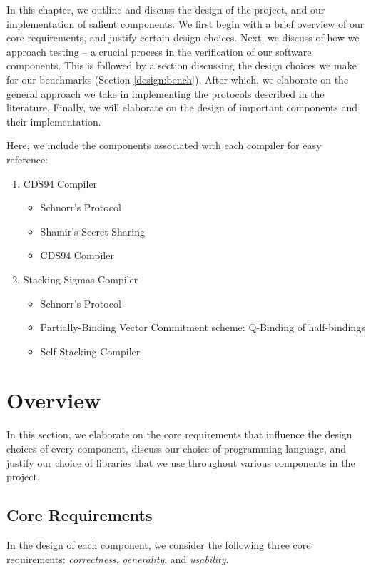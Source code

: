 In this chapter, we outline and discuss the design of the project, and our 
implementation of salient components. 
We first begin with a brief overview of our core requirements, and justify certain design choices.  
Next, we discuss of how we approach testing -- a crucial process in the 
verification of our software components. This is followed by a section discussing the design 
choices we make for our benchmarks (Section \ref{design:bench}). After which, 
we elaborate on the general approach we take in implementing the protocols described in 
the literature. Finally, we will elaborate on the design of important components 
and their implementation.

Here, we include the components associated with each compiler for easy reference:

\begin{enumerate}
  \item CDS94 Compiler
  \begin{itemize}
    \item Schnorr's Protocol     
    \item Shamir's Secret Sharing 
    \item CDS94 Compiler 
  \end{itemize}
  \item Stacking Sigmas Compiler
  \begin{itemize}
    \item Schnorr's Protocol 
    \item Partially-Binding Vector Commitment scheme: Q-Binding of half-bindings 
    \item Self-Stacking Compiler
  \end{itemize}
\end{enumerate}

\section{Overview}\label{design:overview}
In this section, we 
elaborate on the core requirements that influence the design choices of 
every component, discuss our choice of programming language, and justify 
our choice of libraries 
that we use throughout various components in the project. 
\subsection{Core Requirements}
In the design of each component, we consider the following 
three core requirements: \emph{correctness}, \emph{generality}, and 
\emph{usability}. 

